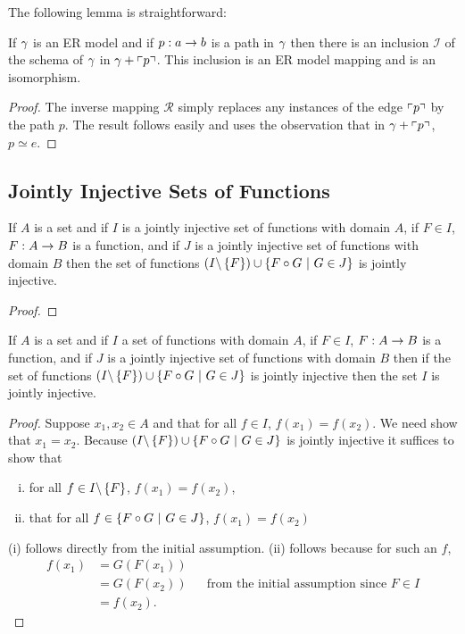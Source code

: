 The following lemma is straightforward:
\begin{lemma}
If $\gamma$ is an ER model and if $p:a \rightarrow b$ is a path in $\gamma$ then
there is an inclusion  $\mathcal{I}$ of the schema of $\gamma$ in $\gamma + \left\ulcorner p\right\urcorner$. This inclusion is an ER model mapping and is an isomorphism. 
\end{lemma}
\begin{proof}
The inverse mapping $\mathcal{R}$ simply replaces any instances of the edge $\left\ulcorner p\right\urcorner$ by the path $p$. The result follows easily and uses the observation that in $\gamma + \left\ulcorner p\right\urcorner$, $p \simeq e$.
\end{proof}


\subsection{Jointly Injective Sets of Functions}
\begin{lemma}
\label{jointlyinjectivecomposition}
If $A$ is a set and if $I$  is a jointly injective set of functions with domain $A$, if $F \in I$, $F: A \rightarrow B$ is a function,
and if $J$ is a jointly injective set of functions with domain $B$ then the set of functions
$(I \backslash \left\{F\right\}) \cup \left\{F \circ G \ \middle|\ G \in J\right\}$ is jointly injective.
\end{lemma}
\begin{proof}

\end{proof}

\begin{lemma}
\label{jointlyinjectivefactorisation}
If $A$ is a set and if $I$  a set of functions with domain $A$, if $F \in I$, $F: A \rightarrow B$ is a function,
and if $J$ is a jointly injective set of functions with domain $B$ then if the set of functions
$(I \backslash \left\{F\right\}) \cup \left\{F \circ G \ \middle|\ G \in J\right\}$ is jointly injective then the
set $I$ is jointly injective.
\end{lemma}
\begin{proof}
Suppose $x_1,x_2 \in A$ and that for all $f \in I$, $f(x_1)=f(x_2)$. We need show that $x_1=x_2$.
Because $(I \backslash \left\{F\right\}) \cup \left\{F \circ G \ \middle|\ G \in J\right\}$ is jointly injective
it suffices to show that 
\begin{enumerate}[(i)]
\item
for all $f \in I \backslash \left\{F\right\}$, $f(x_1)=f(x_2)$, 
\item that for all $f \in \left\{F \circ G \ \middle|\ G \in J\right\}$, $f(x_1)=f(x_2)$
\end{enumerate}
(i) follows directly from the initial assumption. 
(ii) follows because for such an $f$, 
\begin{align*}
f(x_1)&=G(F(x_1)) & & \\
      &=G(F(x_2)) & & \mbox{from the initial assumption since }F \in I \\
			&=f(x_2). & &
\end{align*}
\end{proof}

